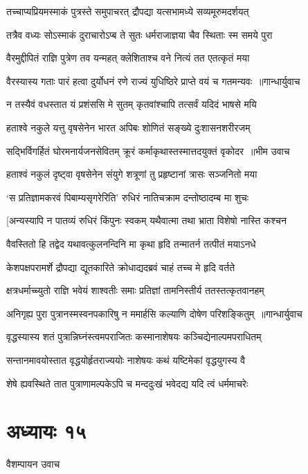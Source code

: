 \twolineshloka
{तच्चाप्यप्रियमस्माकं पुत्रस्ते समुपाचरत्}
{द्रौपद्या यत्सभामध्ये सव्यमूरुमदर्शयत्}


\twolineshloka
{तत्रैव वध्यः सोऽस्माकं दुराचारोऽप्ब ते सुतः}
{धर्मराजाज्ञया चैव स्थिताः स्म समये पुरा}


\twolineshloka
{वैरमुद्दीपितं राज्ञि पुत्रेण तव यन्महत्}
{क्लेशिताश्च वने नित्यं तत एतत्कृतं मया}


\threelineshloka
{वैरस्यास्य गताः पारं हत्वा दुर्योधनं रणे}
{राज्यं युधिष्ठिरे प्राप्ते वयं च गतमन्यवः ॥गान्धार्युवाच}
{}


\twolineshloka
{न तस्यैवं वधस्तात यं प्रशंससि मे सुतम्}
{कृतवांश्चापि तत्सर्वं यदिदं भाषसे मयि}


\twolineshloka
{हताश्वे नकुले यत्तु वृषसेनेन भारत}
{अपिबः शोणितं सङ्ख्ये दुःशासनशरीरजम्}


\threelineshloka
{सद्भिर्विगर्हितं घोरमनार्यजनसेवितम्}
{क्रूरं कर्माकृथास्तस्मात्तदयुक्तं वृकोदर ॥भीम उवाच}
{}


\twolineshloka
{हताश्वं नकुलं दृष्ट्वा वृषसेनेन संयुगे}
{शत्रूणां तु प्रहृष्टानां त्रासः सञ्जनितो मया}


\twolineshloka
{`स प्रतिज्ञामकरवं पिबाम्यसृगरेरिति'}
{रुधिरं नातिचक्राम दन्तोष्ठादम्ब मा शुचः}


\twolineshloka
{[अन्यस्यापि न पातव्यं रुधिरं किंपुनः स्वकम्}
{यथैवात्मा तथा भ्राता विशेषो नास्ति कश्चन}


\twolineshloka
{वैवस्तितो हि तद्वेद यथावत्कुलनन्दिनि}
{मा कृथा हृदि तन्मातर्न तत्पीतं मयाऽनधे}


\twolineshloka
{केशपक्षपरामर्शे द्रौपद्या द्यूतकारिते}
{क्रोधाद्यदब्रवं चाहं तच्च मे हृदि वर्तते}


\twolineshloka
{क्षत्रधर्माच्च्युतो राज्ञि भवेयं शाश्वतीः समाः}
{प्रतिज्ञां तामनिस्तीर्य ततस्तत्कृतवानहम्}


\threelineshloka
{अनिगृह्य पुरा पुत्रानस्मस्वनपकारिषु}
{न ममार्हसि कल्याणि दोषेण परिशङ्कितुम् ॥गान्धार्युवाच}
{}


\twolineshloka
{वृद्धस्यास्य शतं पुत्रान्निघ्नंस्त्वमपराजितः}
{कस्मानाशेषयः कञ्चिद्येनाल्पमपराधितम्}


\twolineshloka
{सन्तानमावयोस्तात वृद्धयोर्हृतराज्ययोः}
{नाशेषयः कथं यष्टिमेकां वृद्धयुगस्य वै}


\twolineshloka
{शेषे ह्यवस्थिते तात पुत्राणामल्पकेऽपि च}
{मन्ददुःखं भवेदद्य यदि त्वं धर्ममाचरेः}


\chapter{अध्यायः १५}
\twolineshloka
{वैशम्पायन उवाच}
{}


